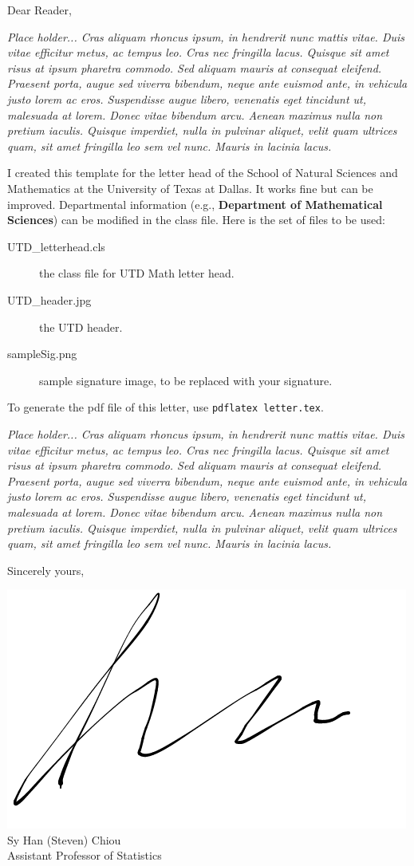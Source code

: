 \documentclass{UTD_letterhead}
\begin{document}
\opening{Dear Reader,}

\textit{Place holder... Cras aliquam rhoncus ipsum, in hendrerit nunc mattis vitae. Duis vitae efficitur metus, ac tempus leo. Cras nec fringilla lacus. Quisque sit amet risus at ipsum pharetra commodo. Sed aliquam mauris at consequat eleifend. Praesent porta, augue sed viverra bibendum, neque ante euismod ante, in vehicula justo lorem ac eros. Suspendisse augue libero, venenatis eget tincidunt ut, malesuada at lorem. Donec vitae bibendum arcu. Aenean maximus nulla non pretium iaculis. Quisque imperdiet, nulla in pulvinar aliquet, velit quam ultrices quam, sit amet fringilla leo sem vel nunc. Mauris in lacinia lacus.}

I created this template for the letter head of the School of Natural Sciences and Mathematics at the University of Texas at Dallas.
It works fine but can be improved. Departmental information (e.g., \textbf{Department of Mathematical Sciences}) can be modified in the class file. 
Here is the set of files to be used:
\begin{description}
\item[UTD\_letterhead.cls] the class file for UTD Math letter head.
\item[UTD\_header.jpg] the UTD header.
\item[sampleSig.png] sample signature image, to be replaced with your signature.
\end{description}

To generate the pdf file of this letter, use \texttt{pdflatex letter.tex}.

\textit{Place holder... Cras aliquam rhoncus ipsum, in hendrerit nunc mattis vitae. Duis vitae efficitur metus, ac tempus leo. Cras nec fringilla lacus. Quisque sit amet risus at ipsum pharetra commodo. Sed aliquam mauris at consequat eleifend. Praesent porta, augue sed viverra bibendum, neque ante euismod ante, in vehicula justo lorem ac eros. Suspendisse augue libero, venenatis eget tincidunt ut, malesuada at lorem. Donec vitae bibendum arcu. Aenean maximus nulla non pretium iaculis. Quisque imperdiet, nulla in pulvinar aliquet, velit quam ultrices quam, sit amet fringilla leo sem vel nunc. Mauris in lacinia lacus.}

\closing{Sincerely yours,} 
\vspace{-2.5cm}
\includegraphics[scale = 0.15]{sampleSig}\\
\noindent Sy Han (Steven) Chiou \\Assistant Professor of Statistics
\end{document}
